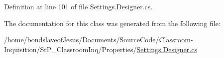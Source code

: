 \-Definition at line 101 of file \-Settings.\-Designer.\-cs.



\-The documentation for this class was generated from the following file\-:\begin{DoxyCompactItemize}
\item 
/home/bondslaveof\-Jesus/\-Documents/\-Source\-Code/\-Classroom-\/\-Inquisition/\-Sr\-P\-\_\-\-Classroom\-Inq/\-Properties/\hyperlink{_settings_8_designer_8cs}{\-Settings.\-Designer.\-cs}\end{DoxyCompactItemize}
